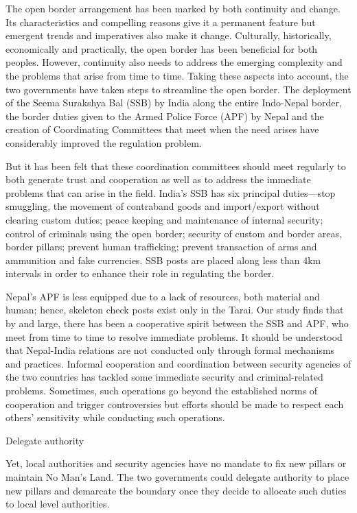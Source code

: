 \documentclass[
  openany]{book}
\begin{document}
The open border arrangement has been marked by both continuity and change. Its characteristics and compelling reasons give it a permanent feature but emergent trends and imperatives also make it change. Culturally, historically, economically and practically, the open border has been beneficial for both peoples. However, continuity also needs to address the emerging complexity and the problems that arise from time to time. Taking these aspects into account, the two governments have taken steps to streamline the open border. The deployment of the Seema Surakshya Bal (SSB) by India along the entire Indo-Nepal border, the border duties given to the Armed Police Force (APF) by Nepal and the creation of Coordinating Committees that meet when the need arises have considerably improved the regulation problem.

But it has been felt that these coordination committees should meet regularly to both generate trust and cooperation as well as to address the immediate problems that can arise in the field. India's SSB has six principal duties---stop smuggling, the movement of contraband goods and import/export without clearing custom duties; peace keeping and maintenance of internal security; control of criminals using the open border; security of custom and border areas, border pillars; prevent human trafficking; prevent transaction of arms and ammunition and fake currencies. SSB posts are placed along less than 4km intervals in order to enhance their role in regulating the border.

Nepal's APF is less equipped due to a lack of resources, both material and human; hence, skeleton check posts exist only in the Tarai. Our study finds that by and large, there has been a cooperative spirit between the SSB and APF, who meet from time to time to resolve immediate problems. It should be understood that Nepal-India relations are not conducted only through formal mechanisms and practices. Informal cooperation and coordination between security agencies of the two countries has tackled some immediate security and criminal-related problems. Sometimes, such operations go beyond the established norms of cooperation and trigger controversies but efforts should be made to respect each others' sensitivity while conducting such operations.

Delegate authority

Yet, local authorities and security agencies have no mandate to fix new pillars or maintain No Man's Land. The two governments could delegate authority to place new pillars and demarcate the boundary once they decide to allocate such duties to local level authorities.
\end{document}
